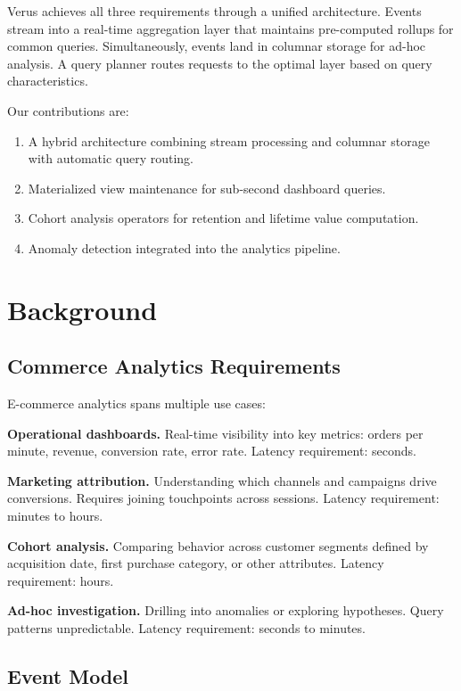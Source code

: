 \documentclass[11pt,twocolumn]{article}
\begin{document}
Verus achieves all three requirements through a unified architecture. Events stream into a real-time aggregation layer that maintains pre-computed rollups for common queries. Simultaneously, events land in columnar storage for ad-hoc analysis. A query planner routes requests to the optimal layer based on query characteristics.

Our contributions are:
\begin{enumerate}
\item A hybrid architecture combining stream processing and columnar storage with automatic query routing.
\item Materialized view maintenance for sub-second dashboard queries.
\item Cohort analysis operators for retention and lifetime value computation.
\item Anomaly detection integrated into the analytics pipeline.
\end{enumerate}

\section{Background}

\subsection{Commerce Analytics Requirements}

E-commerce analytics spans multiple use cases:

\textbf{Operational dashboards.} Real-time visibility into key metrics: orders per minute, revenue, conversion rate, error rate. Latency requirement: seconds.

\textbf{Marketing attribution.} Understanding which channels and campaigns drive conversions. Requires joining touchpoints across sessions. Latency requirement: minutes to hours.

\textbf{Cohort analysis.} Comparing behavior across customer segments defined by acquisition date, first purchase category, or other attributes. Latency requirement: hours.

\textbf{Ad-hoc investigation.} Drilling into anomalies or exploring hypotheses. Query patterns unpredictable. Latency requirement: seconds to minutes.

\subsection{Event Model}
\end{document}
